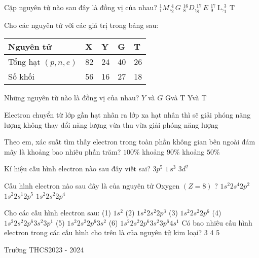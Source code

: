 \begin{ex}
	Cặp nguyên tử nào sau đây là đồng vị của nhau?
	{$_1^1 M,_2^4 G$}
	{$_8^{16} D,_8^{17} E$}
	{$_9^{17} \mathrm{~L},_1^3 \mathrm{~T}$}
\end{ex}
\begin{ex}
	Cho các nguyên tử với các giá trị trong bảng sau:\par
	\begin{center}
		\begin{tabular}{lllll}
		\hline Nguyên tử & X& Y& G& T\\
		\hline Tổng hạt $(p, n, e)$ & 82 & 24 & 40 & 26 \\
		\hline Số khối & 56 & 16 & 27 & 18 \\
		\hline
		\end{tabular}\par
	\end{center}
	Những nguyên từ nào là đồng vị của nhau?
	{$Y$ và $G$}
	{Gvà T}
	{Yvà T}
\end{ex}
\begin{ex}
	Electron chuyển từ lớp gần hạt nhân ra lớp xa hạt nhân thì sẽ
	{giải phóng năng lượng}
	{không thay đổi năng lượng}
	{vừa thu vừa giải phóng năng lượng}
\end{ex}
\begin{ex}
	Theo em, xác suất tìm thấy electron trong toàn phần không gian bên ngoài đám mây là khoảng bao nhiêu phần trăm?
	{$100 \%$}
	{khoảng $90 \%$}
	{khoảng $50 \%$}
\end{ex}
\begin{ex}
	Kí hiệu cấu hình electron nào sau đây viết sai?
	{$3 p^5$}
	{$1 \mathrm{~s}^3$}
	{$3 d^2$}
\end{ex}
\begin{ex}
	Cấu hình electron nào sau đây là của nguyên tử Oxygen $(Z=8)$ ?
	{$1 s^2 2 s^4 2 p^2$}
	{$1 s^2 2 s^1 2 p^5$}
	{$1 s^2 2 s^2 2 p^4$}
\end{ex}
\begin{ex}
	Cho các cấu hình electron sau:
	(1) $1 s^2$
	(2) $1 s^2 2 s^2 2 p^3$
	(3) $1 s^2 2 s^2 2 p^6$
	(4) $1 s^2 2 s^2 2 p^6 3 s^2 3 p^1$
	(5) $1 s^2 2 s^2 2 p^6 3 s^2$
	(6) $1 s^2 2 s^2 2 p^6 3 s^2 3 p^6 4 s^1$
	Có bao nhiêu cấu hình electron trong các cấu hình cho trên là của nguyên tử kim loại?
	{3}
	{4}
	{5}
\end{ex}
\label{\x}
\def\x{210}
\setcounter{bt}{0}
\setcounter{ex}{0}
\begin{name}[][Hóa][10][]{Trường THCS}{2023 - 2024}
\end{name}

